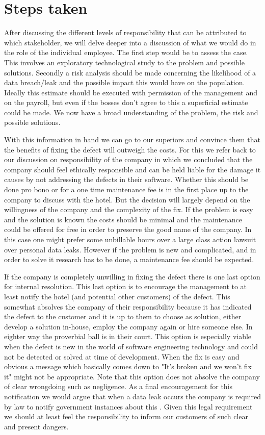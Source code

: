 \section{Steps taken}
After discussing the different levels of responsibility that can be attributed to which stakeholder, we will delve deeper into a discussion of what we would do in the role of the individual employee. The first step would be to assess the case. This involves an exploratory technological study to the problem and possible solutions. Secondly a risk analysis should be made concerning the likelihood of a data breach/leak and the possible impact this would have on the population. Ideally this estimate should be executed with permission of the management and on the payroll, but even if the bosses don't agree to this a superficial estimate could be made. We now have a broad understanding of the problem, the risk and possible solutions. 

With this information in hand we can go to our superiors and convince them that the benefits of fixing the defect will outweigh the costs. For this we refer back to our discussion on responsibility of the company in which we concluded that the company should feel ethically responsible and can be held liable for the damage it causes by not addressing the defects in their software. Whether this should be done pro bono or for a one time maintenance fee is in the first place up to the company to discuss with the hotel. But the decision will largely depend on the willingness of the company and the complexity of the fix. If the problem is easy and the solution is known the costs should be minimal and the maintenance could be offered for free in order to preserve the good name of the company. In this case one might prefer some unbillable hours over a large class action lawsuit over personal data leaks. However if the problem is new and complicated, and in order to solve it research has to be done, a maintenance fee should be expected.

If the company is completely unwilling in fixing the defect there is one last option for internal resolution. This last option is to encourage the management  to at least notify the hotel (and potential other customers) of the defect. This somewhat absolves the company of their responsibility because it has indicated the defect to the customer and it is up to them to choose as solution, either develop a solution in-house, employ the company again or hire someone else. In eighter way the proverbial ball is in their court. This option is especially viable when the defect is new in the world of software engineering technology and could not be detected or solved at time of development. When the fix is easy and obvious a message which basically comes down to "It's broken and we won't fix it" might not be appropriate. Note that this option does not absolve the company of clear wrongdoing such as negligence. As a final encouragement for this notification we would argue that when a data leak occurs the company is required by law to notify government instances about this \cite{privacy_directive}. Given this legal requirement we should at least feel the responsibility to inform our customers of such clear and present dangers.

